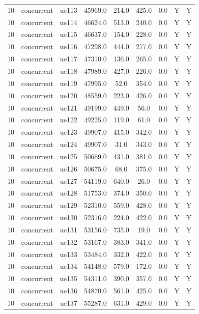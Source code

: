\begin{table}[ht]
\begin{tabular}{|c|c|c|c|c|c|c|c|c|}
10 & concurrent & ue113 & 45969.0 & 214.0 & 425.0 & 0.0 & Y & Y \\
10 & concurrent & ue114 & 46624.0 & 513.0 & 240.0 & 0.0 & Y & Y \\
10 & concurrent & ue115 & 46637.0 & 154.0 & 228.0 & 0.0 & Y & Y \\
10 & concurrent & ue116 & 47298.0 & 444.0 & 277.0 & 0.0 & Y & Y \\
10 & concurrent & ue117 & 47310.0 & 136.0 & 265.0 & 0.0 & Y & Y \\
10 & concurrent & ue118 & 47989.0 & 427.0 & 226.0 & 0.0 & Y & Y \\
10 & concurrent & ue119 & 47995.0 & 52.0 & 354.0 & 0.0 & Y & Y \\
10 & concurrent & ue120 & 48559.0 & 223.0 & 426.0 & 0.0 & Y & Y \\
10 & concurrent & ue121 & 49199.0 & 449.0 & 56.0 & 0.0 & Y & Y \\
10 & concurrent & ue122 & 49225.0 & 119.0 & 61.0 & 0.0 & Y & Y \\
10 & concurrent & ue123 & 49907.0 & 415.0 & 342.0 & 0.0 & Y & Y \\
10 & concurrent & ue124 & 49907.0 & 31.0 & 343.0 & 0.0 & Y & Y \\
10 & concurrent & ue125 & 50669.0 & 431.0 & 381.0 & 0.0 & Y & Y \\
10 & concurrent & ue126 & 50675.0 & 68.0 & 375.0 & 0.0 & Y & Y \\
10 & concurrent & ue127 & 54119.0 & 640.0 & 26.0 & 0.0 & Y & Y \\
10 & concurrent & ue128 & 51753.0 & 374.0 & 350.0 & 0.0 & Y & Y \\
10 & concurrent & ue129 & 52310.0 & 559.0 & 428.0 & 0.0 & Y & Y \\
10 & concurrent & ue130 & 52316.0 & 224.0 & 422.0 & 0.0 & Y & Y \\
10 & concurrent & ue131 & 53156.0 & 735.0 & 19.0 & 0.0 & Y & Y \\
10 & concurrent & ue132 & 53167.0 & 383.0 & 341.0 & 0.0 & Y & Y \\
10 & concurrent & ue133 & 53484.0 & 332.0 & 422.0 & 0.0 & Y & Y \\
10 & concurrent & ue134 & 54148.0 & 579.0 & 172.0 & 0.0 & Y & Y \\
10 & concurrent & ue135 & 54311.0 & 390.0 & 357.0 & 0.0 & Y & Y \\
10 & concurrent & ue136 & 54870.0 & 561.0 & 425.0 & 0.0 & Y & Y \\
10 & concurrent & ue137 & 55287.0 & 631.0 & 429.0 & 0.0 & Y & Y \\

\end{tabular}
\end{table}
